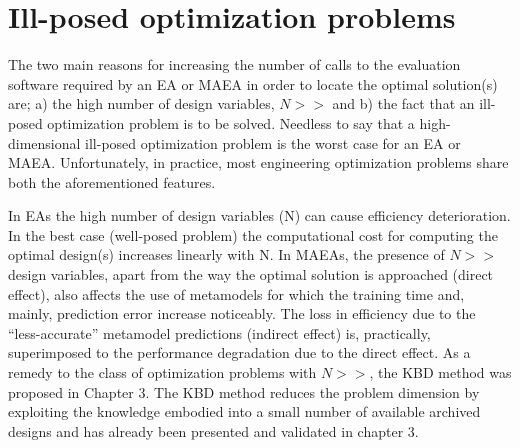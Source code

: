



 

\section{Ill-posed optimization problems}
\label{illpost}
The two main reasons for increasing the number of calls to the evaluation software  required by an EA or MAEA in order to locate the optimal solution(s) are; a) the high number of design variables, $N\!>>$ and b) the fact that an ill-posed optimization problem is to be solved. Needless to say that a high-dimensional ill-posed optimization problem is the worst case for an EA or MAEA.  Unfortunately, in practice, most engineering optimization problems share both the aforementioned features. 

In EAs the high number of design variables (N) can cause efficiency deterioration. In the best case (well-posed problem) the computational cost for computing the optimal design(s) increases linearly with N. In MAEAs, the presence of $N\!>>$ design variables, apart from the way the optimal solution is approached (direct effect), also affects the use of metamodels for which the training time and, mainly,  prediction error increase noticeably. The loss in efficiency due to the ``less-accurate'' metamodel predictions (indirect effect) is, practically, superimposed to the performance degradation due to the direct effect.  As a remedy to the class of optimization problems with $N\!>>$, the KBD method was proposed in Chapter 3. The KBD method reduces the problem dimension by exploiting the knowledge embodied into a small number of available archived designs and has already been presented and validated in chapter 3.             

